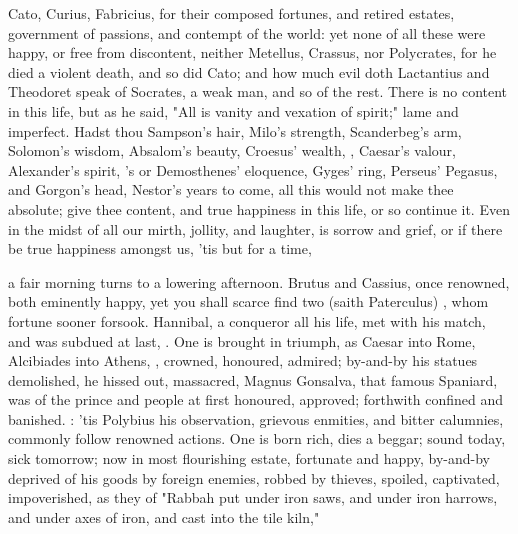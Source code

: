 Cato, Curius, Fabricius, for their composed fortunes, and
retired estates, government of passions, and contempt of the world: yet none of
all these were happy, or free from discontent, neither Metellus, Crassus, nor
Polycrates, for he died a violent death, and so did Cato; and how much evil
doth Lactantius and Theodoret speak of Socrates, a weak man, and so of the
rest. There is no content in this life, but as he said,
"All is vanity and vexation of spirit;" lame and imperfect. Hadst thou
Sampson's hair, Milo's strength, Scanderbeg's arm, Solomon's wisdom, Absalom's
beauty, Croesus' wealth, , Caesar's valour, Alexander's
spirit, \Tully{}'s or Demosthenes' eloquence, Gyges' ring, Perseus' Pegasus, and
Gorgon's head, Nestor's years to come, all this would not make thee absolute;
give thee content, and true happiness in this life, or so continue it. Even in
the midst of all our mirth, jollity, and laughter, is sorrow and grief, or if
there be true happiness amongst us, 'tis but for a time,


a fair morning turns to a lowering afternoon. Brutus and Cassius, once
renowned, both eminently happy, yet you shall scarce find two (saith
Paterculus) , whom fortune sooner forsook.
Hannibal, a conqueror all his life, met with his match, and was subdued at
last, . One is brought in triumph, as
Caesar into Rome, Alcibiades into Athens, , crowned,
honoured, admired; by-and-by his statues demolished, he hissed out, massacred,
\etc{} Magnus Gonsalva, that famous Spaniard, was of the
prince and people at first honoured, approved; forthwith confined and banished.
: 'tis Polybius his observation, grievous enmities, and bitter
calumnies, commonly follow renowned actions. One is born rich, dies a beggar;
sound today, sick tomorrow; now in most flourishing estate, fortunate and
happy, by-and-by deprived of his goods by foreign enemies, robbed by thieves,
spoiled, captivated, impoverished, as they of "Rabbah put
under iron saws, and under iron harrows, and under axes of iron, and cast into
the tile kiln,"

